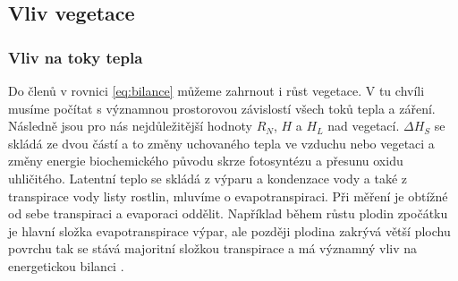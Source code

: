 


\subsection{Vliv vegetace} \label{chap:veg}
\subsubsection{Vliv na toky tepla}
Do členů v rovnici \ref{eq:bilance} můžeme zahrnout i růst vegetace. V tu chvíli musíme počítat s významnou prostorovou závislostí všech toků tepla a záření. Následně jsou pro nás nejdůležitější hodnoty $R_N$, $H$ a $H_L$ nad vegetací. $\Delta H_S$ se skládá ze dvou částí a to změny uchovaného tepla ve vzduchu nebo vegetaci a změny energie biochemického původu skrze fotosyntézu a přesunu oxidu uhličitého. Latentní teplo se skládá z výparu a kondenzace vody a také z transpirace vody listy rostlin, mluvíme o evapotranspiraci. Při měření je obtížné od sebe transpiraci a evaporaci oddělit. Například během růstu plodin zpočátku je hlavní složka evapotranspirace výpar, ale později plodina zakrývá větší plochu povrchu tak se stává majoritní složkou transpirace a má významný vliv na energetickou bilanci \parencite{arya2001, evapotranspiration}. 

